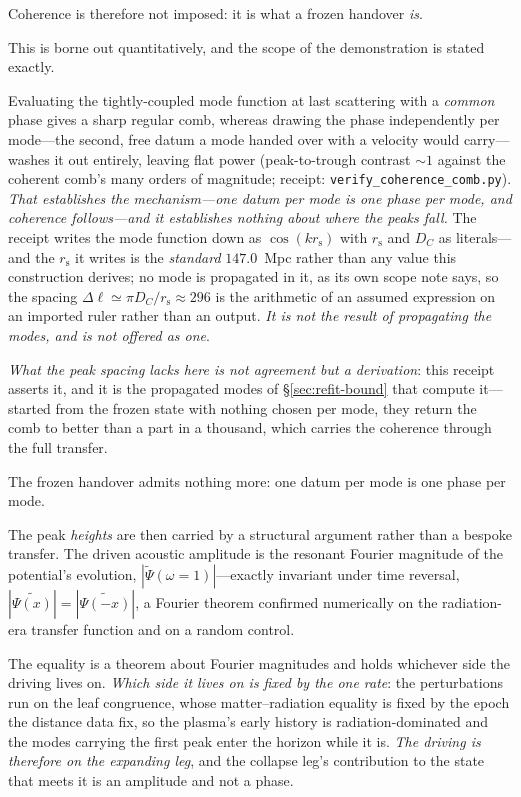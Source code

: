 \documentclass[11pt,a4paper]{article}
\theoremstyle{plain}
\theoremstyle{definition}
\theoremstyle{remark}
\newcommand{\rs}{r_{\mathrm{s}}}
\begin{document}
Coherence is therefore not imposed: it is what a frozen handover \emph{is}. 

This is borne out quantitatively, and the scope of the demonstration is stated exactly. 

Evaluating the tightly-coupled mode function at last scattering with a \emph{common} phase gives a sharp regular comb, whereas drawing the phase independently per mode---the second, free datum a mode handed over with a velocity would carry---washes it out entirely, leaving flat power (peak-to-trough contrast $\sim1$ against the coherent comb's many orders of magnitude; receipt: \texttt{verify\_coherence\_comb.py}). \emph{That establishes the mechanism---one datum per mode is one phase per mode, and coherence follows---and it establishes nothing about where the peaks fall.} The receipt writes the mode function down as $\cos(k\rs)$ with $\rs$ and $D_{C}$ as literals---and the $\rs$ it writes is the \emph{standard} $147.0$~Mpc rather than any value this construction derives; no mode is propagated in it, as its own scope note says, so the spacing $\Delta\ell\simeq\pi D_{C}/\rs\approx296$ is the arithmetic of an assumed expression on an imported ruler rather than an output. \emph{It is not the result of propagating the modes, and is not offered as one}. 

\emph{What the peak spacing lacks here is not agreement but a derivation}: this receipt asserts it, and it is the propagated modes of \S\ref{sec:refit-bound} that compute it---started from the frozen state with nothing chosen per mode, they return the comb to better than a part in a thousand, which carries the coherence through the full transfer. 

The frozen handover admits nothing more: one datum per mode is one phase per mode. 

The peak \emph{heights} are then carried by a structural argument rather than a bespoke transfer. The driven acoustic amplitude is the resonant Fourier magnitude of the potential's evolution, $|\tilde\Psi(\omega{=}1)|$---exactly invariant under time reversal, $|\widetilde{\Psi(x)}|=|\widetilde{\Psi(-x)}|$, a Fourier theorem confirmed numerically on the radiation-era transfer function and on a random control. 

The equality is a theorem about Fourier magnitudes and holds whichever side the driving lives on. \emph{Which
side it lives on is fixed by the one rate}: the perturbations run on the leaf congruence, whose matter--radiation
equality is fixed by the epoch the distance data fix, so the plasma's early history is radiation-dominated and
the modes carrying the first peak enter the horizon while it is. \emph{The driving is therefore on the
expanding leg}, and the collapse leg's contribution to the state that meets it is an amplitude and not a
phase.
\end{document}
